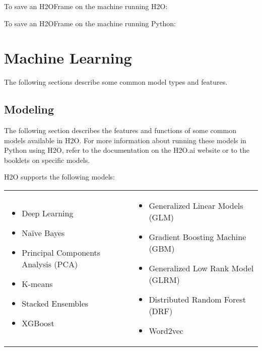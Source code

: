 {To save an H2OFrame on the machine running H2O:


To save an H2OFrame on the machine running Python:


\section{Machine Learning}

The following sections describe some common model types and features. 

\subsection{Modeling}
The following section describes the features and functions of some common models available in H2O.  For more information about running these models in Python using H2O, refer to the documentation on
the H2O.ai website or to the booklets on specific models.


H2O supports the following models:  

\begin{frame}%

\begin{tabular}{p{5.0cm}p{6.0cm}}

\begin{itemize}
  \item Deep Learning
  \item Na\"{i}ve Bayes
  \item Principal Components Analysis (PCA)
  \item K-means
  \item Stacked Ensembles
  \item XGBoost
\end{itemize} &

\begin{itemize}
  \item Generalized Linear Models (GLM) 
  \item Gradient Boosting Machine (GBM)
  \item Generalized Low Rank Model (GLRM)
  \item Distributed Random Forest (DRF)
  \item Word2vec
\end{itemize}


\end{tabular}
\end{frame}}
